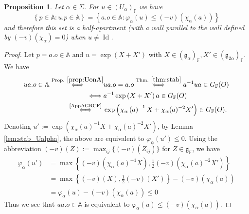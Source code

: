 \documentclass[12pt]{amsart}
\newcommand{\F}{\mathbb{F} }
\newcommand{\frakg}{\mathfrak{g}}
\newcommand{\A}{\mathbb{A}}
\numberwithin{equation}{section}
\newtheorem{proposition}[theorem]{Proposition}
\theoremstyle{remark} %
\begin{document}
\begin{proposition}\label{prop:Ualphaconv}
	Let $\alpha \in \Sigma$. For $u \in (U_\alpha)_\F$ we have
	$$
	\left\{ p \in \mathbb{A} \colon u.p  \in \mathbb{A}  \right\} = \left\{ a.o \in \A \colon \varphi_\alpha(u) \leq (-v)\left(\chi_\alpha\left(a\right)\right)  \right\}
	$$
	and therefore this set is a half-apartment (with a wall parallel to the wall defined by $(-v)(\chi_\alpha) = 0$) when $u \neq \operatorname{Id}$. 
\end{proposition}
\begin{proof}
	Let $p=a.o \in \A$ and $u = \exp(X+X')$ with $X\in (\frakg_\alpha)_\F, X'\in (\frakg_{2\alpha})_\F$. We have
	\begin{align*}
		ua.o \in \A \stackrel{\text{Prop. }\ref{prop:UonA}}{\iff} & ua.o = a.o 
		\stackrel{\text{Thm. }\ref{thm:stab}}{\iff} a^{-1}ua \in G_\F(O) \\
		\iff &a^{-1} \exp\left(X + X'\right) a \in G_\F(O) \\
		\stackrel{ 
			\text{
				 \cite[Lemma \ref{I-lem:aexpXa}]{AppAGRCF}
			}
		 }{\iff} &\exp\left( \chi_\alpha\left(a\right)^{-1} X + \chi_\alpha(a)^{-2} X' \right) \in G_\F(O).
	\end{align*}
	Denoting $u' := \exp\left( \chi_\alpha\left(a\right)^{-1} X + \chi_\alpha(a)^{-2} X' \right)  $, by Lemma \ref{lem:stab_Ualpha}, the above are equivalent to ${\varphi_\alpha(u') \leq 0}$. Using the abbreviation $(-v)(Z) := \max_{ij}\{ (-v)(Z_{ij}) \}$ for $Z \in \frakg_\F$, we have
	\begin{align*}
		\varphi_\alpha(u') &= \max \left\{ (-v)\left( \chi_\alpha(a)^{-1}X  \right), \frac{1}{2} (-v)\left( \chi_\alpha(a)^{-2} X'  \right) \right\} \\
		&= \max \left\{  (-v)\left( X  \right), \frac{1}{2} (-v)\left(  X'  \right)  \right\} - (-v)(\chi_\alpha(a)) \\
		&= \varphi_\alpha(u) - (-v)(\chi_\alpha(a)) \leq 0 
	\end{align*}
	Thus we see that $ua.o \in \A$ is equivalent to $\varphi_\alpha(u) \leq (-v)(\chi_\alpha(a))$.

\end{proof}
\end{document}
